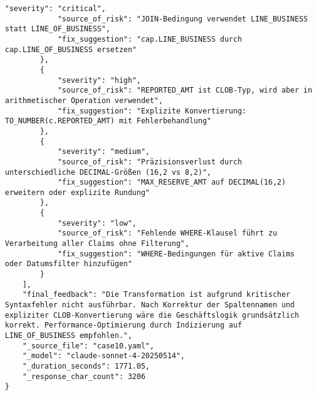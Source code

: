\begin{lstlisting}[caption={Ausgabe: Claude Sonnet 4 Anwendungsfall 10 Konsistenzdurchlauf},label={claude_case10_prompt2}]
            "severity": "critical",
            "source_of_risk": "JOIN-Bedingung verwendet LINE_BUSINESS statt LINE_OF_BUSINESS",
            "fix_suggestion": "cap.LINE_BUSINESS durch cap.LINE_OF_BUSINESS ersetzen"
        },
        {
            "severity": "high",
            "source_of_risk": "REPORTED_AMT ist CLOB-Typ, wird aber in arithmetischer Operation verwendet",
            "fix_suggestion": "Explizite Konvertierung: TO_NUMBER(c.REPORTED_AMT) mit Fehlerbehandlung"
        },
        {
            "severity": "medium",
            "source_of_risk": "Präzisionsverlust durch unterschiedliche DECIMAL-Größen (16,2 vs 8,2)",
            "fix_suggestion": "MAX_RESERVE_AMT auf DECIMAL(16,2) erweitern oder explizite Rundung"
        },
        {
            "severity": "low",
            "source_of_risk": "Fehlende WHERE-Klausel führt zu Verarbeitung aller Claims ohne Filterung",
            "fix_suggestion": "WHERE-Bedingungen für aktive Claims oder Datumsfilter hinzufügen"
        }
    ],
    "final_feedback": "Die Transformation ist aufgrund kritischer Syntaxfehler nicht ausführbar. Nach Korrektur der Spaltennamen und expliziter CLOB-Konvertierung wäre die Geschäftslogik grundsätzlich korrekt. Performance-Optimierung durch Indizierung auf LINE_OF_BUSINESS empfohlen.",
    "_source_file": "case10.yaml",
    "_model": "claude-sonnet-4-20250514",
    "_duration_seconds": 1771.05,
    "_response_char_count": 3206
}
\end{lstlisting}

